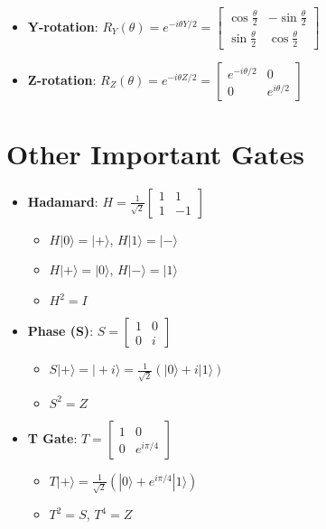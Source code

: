 \begin{multicols}{3}
\begin{itemize}[leftmargin=*,nosep,topsep=0pt]
    \item \textbf{Y-rotation}: $R_Y(\theta) = e^{-i\theta Y/2} = \begin{bmatrix} \cos\frac{\theta}{2} & -\sin\frac{\theta}{2} \\ \sin\frac{\theta}{2} & \cos\frac{\theta}{2} \end{bmatrix}$

    \item \textbf{Z-rotation}: $R_Z(\theta) = e^{-i\theta Z/2} = \begin{bmatrix} e^{-i\theta/2} & 0 \\ 0 & e^{i\theta/2} \end{bmatrix}$
\end{itemize}

\section*{Other Important Gates}
\begin{itemize}[leftmargin=*,nosep,topsep=0pt]
    \item \textbf{Hadamard}: $H = \frac{1}{\sqrt{2}}\begin{bmatrix} 1 & 1 \\ 1 & -1 \end{bmatrix}$
    \begin{itemize}[nosep]
        \item $H|0\rangle = |+\rangle$, $H|1\rangle = |-\rangle$
        \item $H|+\rangle = |0\rangle$, $H|-\rangle = |1\rangle$
        \item $H^2 = I$
    \end{itemize}

    \item \textbf{Phase (S)}: $S = \begin{bmatrix} 1 & 0 \\ 0 & i \end{bmatrix}$
    \begin{itemize}[nosep]
        \item $S|+\rangle = |+i\rangle = \frac{1}{\sqrt{2}}(|0\rangle + i|1\rangle)$
        \item $S^2 = Z$
    \end{itemize}

    \item \textbf{T Gate}: $T = \begin{bmatrix} 1 & 0 \\ 0 & e^{i\pi/4} \end{bmatrix}$
    \begin{itemize}[nosep]
        \item $T|+\rangle = \frac{1}{\sqrt{2}}(|0\rangle + e^{i\pi/4}|1\rangle)$
        \item $T^2 = S$, $T^4 = Z$
    \end{itemize}


\end{itemize}
\end{multicols}
